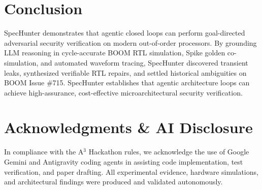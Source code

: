\documentclass[conference,10pt]{IEEEtran}
\begin{document}
\section{Conclusion}
SpecHunter demonstrates that agentic closed loops can perform goal-directed adversarial security verification on modern out-of-order processors. By grounding LLM reasoning in cycle-accurate BOOM RTL simulation, Spike golden co-simulation, and automated waveform tracing, SpecHunter discovered transient leaks, synthesized verifiable RTL repairs, and settled historical ambiguities on BOOM Issue \#715. SpecHunter establishes that agentic architecture loops can achieve high-assurance, cost-effective microarchitectural security verification.

\section*{Acknowledgments \& AI Disclosure}
In compliance with the A$^3$ Hackathon rules, we acknowledge the use of Google Gemini and Antigravity coding agents in assisting code implementation, test verification, and paper drafting. All experimental evidence, hardware simulations, and architectural findings were produced and validated autonomously.



\end{document}

